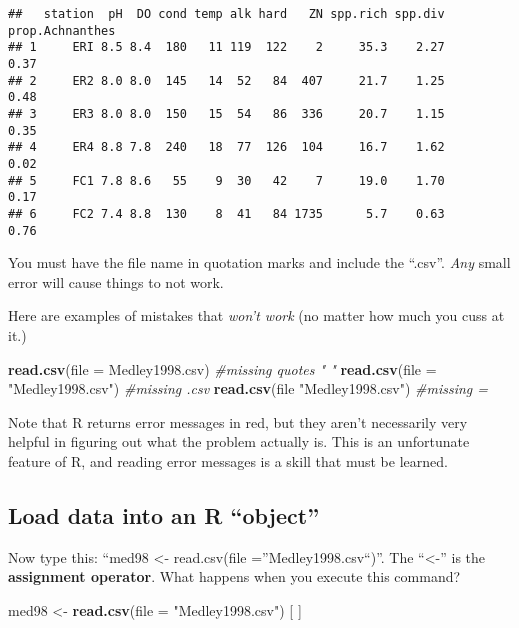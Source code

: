 \documentclass[]{book}
\newenvironment{Shaded}{\begin{snugshade}}{\end{snugshade}}
\newcommand{\KeywordTok}[1]{\textcolor[rgb]{0.13,0.29,0.53}{\textbf{#1}}}
\newcommand{\DataTypeTok}[1]{\textcolor[rgb]{0.13,0.29,0.53}{#1}}
\newcommand{\StringTok}[1]{\textcolor[rgb]{0.31,0.60,0.02}{#1}}
\newcommand{\CommentTok}[1]{\textcolor[rgb]{0.56,0.35,0.01}{\textit{#1}}}
\newcommand{\NormalTok}[1]{#1}
\theoremstyle{definition}
\theoremstyle{definition}
\theoremstyle{definition}
\theoremstyle{remark}
\begin{document}
\begin{verbatim}
##   station  pH  DO cond temp alk hard   ZN spp.rich spp.div prop.Achnanthes
## 1     ERI 8.5 8.4  180   11 119  122    2     35.3    2.27            0.37
## 2     ER2 8.0 8.0  145   14  52   84  407     21.7    1.25            0.48
## 3     ER3 8.0 8.0  150   15  54   86  336     20.7    1.15            0.35
## 4     ER4 8.8 7.8  240   18  77  126  104     16.7    1.62            0.02
## 5     FC1 7.8 8.6   55    9  30   42    7     19.0    1.70            0.17
## 6     FC2 7.4 8.8  130    8  41   84 1735      5.7    0.63            0.76
\end{verbatim}

You must have the file name in quotation marks and include the ``.csv''.
\emph{Any} small error will cause things to not work.

Here are examples of mistakes that \emph{won't work} (no matter how much
you cuss at it.)

\begin{Shaded}
\begin{Highlighting}[]
\KeywordTok{read.csv}\NormalTok{(}\DataTypeTok{file =}\NormalTok{ Medley1998.csv)     }\CommentTok{#missing quotes " "}
\KeywordTok{read.csv}\NormalTok{(}\DataTypeTok{file =} \StringTok{"Medley1998.csv"}\NormalTok{)   }\CommentTok{#missing .csv}
\KeywordTok{read.csv}\NormalTok{(file }\StringTok{"Medley1998.csv"}\NormalTok{)     }\CommentTok{#missing =}
\end{Highlighting}
\end{Shaded}

Note that R returns error messages in red, but they aren't necessarily
very helpful in figuring out what the problem actually is. This is an
unfortunate feature of R, and reading error messages is a skill that
must be learned.

\subsection{\texorpdfstring{Load data into an R
``object''}{Load data into an R object}}\label{load-data-into-an-r-object}

Now type this: ``med98 \textless{}- read.csv(file
=''Medley1998.csv``)''. The ``\textless{}-'' is the \textbf{assignment
operator}. What happens when you execute this command?

\begin{Shaded}
\begin{Highlighting}[]
\NormalTok{med98 <-}\StringTok{ }\KeywordTok{read.csv}\NormalTok{(}\DataTypeTok{file =} \StringTok{"Medley1998.csv"}\NormalTok{) [ ]}
\end{Highlighting}
\end{Shaded}
\end{document}
